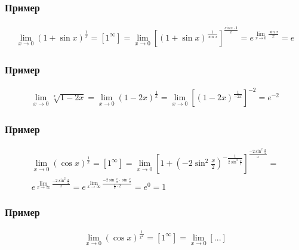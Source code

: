 \documentclass{article}
\begin{document}
\subsubsection{Пример}
\begin{gather*}
    \lim_{x \to 0} \left( 1 + \sin x \right)^{\frac{1}{x}} = 
    \left[ 1^{\infty} \right] =
    \lim_{x \to 0} \left[ \left( 1 + \sin x \right)^{\frac{1}{\sin x}} \right]^{\frac{sin x \cdot 1}{x}} =
    e^{\lim_{x \to 0} \frac{\sin x}{x}} = e 
\end{gather*}

\subsubsection{Пример}
\begin{gather*}
    \lim_{x \to 0} \sqrt[x]{1 - 2x} =
    \lim_{x \to 0} (1 - 2x)^{\frac{1}{x}} =
    \lim_{x \to 0} \left[(1 - 2x)^{\frac{1}{-2x}}\right]^{-2} =
    e^{-2}
\end{gather*}

\subsubsection{Пример}
\begin{gather*}
    \lim_{x \to 0} (\cos x)^{\frac{1}{x}} = 
    [1^\infty] =
    \lim_{x \to 0} \left[ 1 + \left(-2 \sin ^2 \frac{x}{2} \right)^{-\frac{1}{2 \sin ^2 \frac{x}{2}}} \right]^{\frac{-2 \sin ^2 \frac{x}{2}}{x}} = \\
    e^{\lim_{x \to \infty} \frac{-2 \sin ^2 \frac{x}{2}}{x}} = 
    e^{\lim_{x \to \infty} \frac{-2 \sin \frac{x}{2} \cdot \sin \frac{x}{2}}{\frac{x}{2} \cdot 2}} = e^0 = 1
\end{gather*}

\subsubsection{Пример}
\begin{gather*}
    \lim_{x \to 0} (\cos x)^{\frac{1}{x^2}} =
    [1^\infty] =
    \lim_{x \to 0} \left[ ... \right]
\end{gather*}
\end{document}
